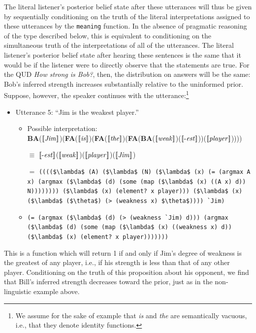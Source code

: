 \documentclass[pdfextras]{handbook}
\newcommand{\llbracket}{\ensuremath{\left [\!\left [}}%
\newcommand{\rrbracket}{\ensuremath{\right ]\!\right ]}}
\providecommand{\sv}[1]{\ensuremath{\llbracket \mathit{#1} \rrbracket}}
\begin{document}
The literal listener's posterior belief state after these utterances will thus be given by sequentially conditioning on the truth of the literal interpretations assigned to these utterances by the \lstinline{meaning} function. 
In the absence of pragmatic reasoning of the type described below, this is equivalent to conditioning on the simultaneous truth of the interpretations of all of the utterances. 
The literal listener's posterior belief state after hearing these sentences is the same that it would be if the listener were to directly observe that the statements are true. 
For the QUD \emph{How strong is Bob?}, then, the distribution on answers will be the same: Bob's inferred strength increases substantially relative to the uninformed prior. 
Suppose, however, the speaker continues with the utterance:\footnote{We assume for the sake of example that \emph{is} and \emph{the} are semantically vacuous, i.e., that they denote identity functions.}
\begin{itemize}
\item Utterance 5: ``Jim is the weakest player.''
\begin{itemize}
\item Possible interpretation:\\ 
\textbf{BA}(\sv{Jim})(\textbf{FA}(\sv{is})(\textbf{FA}(\sv{the})(\textbf{FA}(\textbf{BA}(\sv{weak})(\sv{\text{-}est}))(\sv{player}))))
\item [$\equiv$] \sv{\text{-}est}(\sv{weak})(\sv{player})(\sv{Jim})
\item [$=$] \lstinline[mathescape]{(((($\lambda$ (A) ($\lambda$ (N) ($\lambda$ (x) (= (argmax A x) (argmax ($\lambda$ (d) (some (map ($\lambda$ (x) ((A x) d)) N)))))))) ($\lambda$ (x) (element? x player))) ($\lambda$ (x) ($\lambda$ ($\theta$) (> (weakness x) $\theta$)))) `Jim)}
\item [$\equiv$] \lstinline[mathescape]{(= (argmax ($\lambda$ (d) (> (weakness `Jim) d))) (argmax ($\lambda$ (d) (some (map ($\lambda$ (x) ((weakness x) d)) ($\lambda$ (x) (element? x player)))))))    }
\end{itemize}
\end{itemize}
This is a function which will return 1 if and only if Jim's degree of weakness is the greatest of any player, i.e., if his strength is less than that of any other player. 
Conditioning on the truth of this proposition about his opponent, we find that Bill's inferred strength decreases toward the prior, just as in the non-linguistic example above. 
\end{document}
